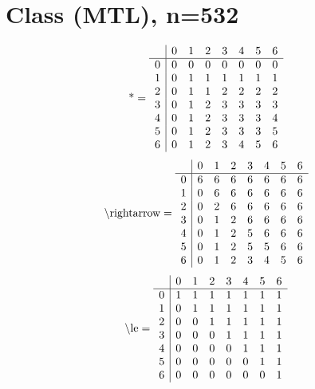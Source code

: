 \documentclass[11pt]{article}
\begin{document}
\section{Class (MTL), n=532}
\[\text{*} = 
\begin{array}{r | r r r r r r r}
 & 0 & 1 & 2 & 3 & 4 & 5 & 6 \\ \hline
0 & 0 & 0 & 0 & 0 & 0 & 0 & 0 \\
1 & 0 & 1 & 1 & 1 & 1 & 1 & 1 \\
2 & 0 & 1 & 1 & 2 & 2 & 2 & 2 \\
3 & 0 & 1 & 2 & 3 & 3 & 3 & 3 \\
4 & 0 & 1 & 2 & 3 & 3 & 3 & 4 \\
5 & 0 & 1 & 2 & 3 & 3 & 3 & 5 \\
6 & 0 & 1 & 2 & 3 & 4 & 5 & 6 \\
\end{array}
\]
\[\text{\textbackslash rightarrow} = 
\begin{array}{r | r r r r r r r}
 & 0 & 1 & 2 & 3 & 4 & 5 & 6 \\ \hline
0 & 6 & 6 & 6 & 6 & 6 & 6 & 6 \\
1 & 0 & 6 & 6 & 6 & 6 & 6 & 6 \\
2 & 0 & 2 & 6 & 6 & 6 & 6 & 6 \\
3 & 0 & 1 & 2 & 6 & 6 & 6 & 6 \\
4 & 0 & 1 & 2 & 5 & 6 & 6 & 6 \\
5 & 0 & 1 & 2 & 5 & 5 & 6 & 6 \\
6 & 0 & 1 & 2 & 3 & 4 & 5 & 6 \\
\end{array}
\]
\[\text{\textbackslash le} = 
\begin{array}{r | r r r r r r r}
 & 0 & 1 & 2 & 3 & 4 & 5 & 6 \\ \hline
0 & 1 & 1 & 1 & 1 & 1 & 1 & 1 \\
1 & 0 & 1 & 1 & 1 & 1 & 1 & 1 \\
2 & 0 & 0 & 1 & 1 & 1 & 1 & 1 \\
3 & 0 & 0 & 0 & 1 & 1 & 1 & 1 \\
4 & 0 & 0 & 0 & 0 & 1 & 1 & 1 \\
5 & 0 & 0 & 0 & 0 & 0 & 1 & 1 \\
6 & 0 & 0 & 0 & 0 & 0 & 0 & 1 \\
\end{array}
\]
\end{document}
